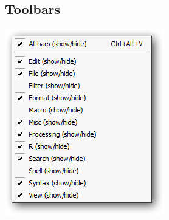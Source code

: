\hypertarget{menu_view_toolbars}{}
\subsection{Toolbars}

\includegraphics[scale=0.50]{./res/menu_view_toolsbar.png}\\

